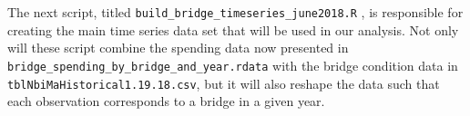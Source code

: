 \documentclass{article}
\begin{document}
The next script, titled \texttt{build\_bridge\_timeseries\_june2018.R}  , is responsible for creating the main time series data set that will be used in our analysis. Not only will these script combine the spending data now presented in \texttt{bridge\_spending\_by\_bridge\_and\_year.rdata} with the bridge condition data in \texttt{tblNbiMaHistorical1.19.18.csv}, but it will also reshape the data such that each observation corresponds to a bridge in a given year. \\


\end{document}
